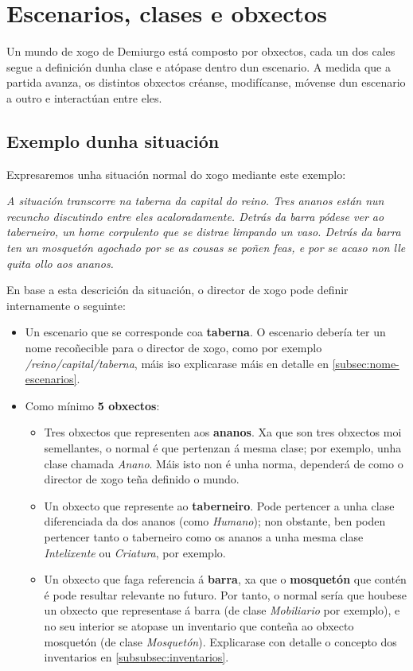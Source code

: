 \chapter{Escenarios, clases e obxectos}
Un mundo de xogo de Demiurgo está composto por obxectos, cada un dos cales
segue a definición dunha clase e atópase dentro dun escenario. A medida que
a partida avanza, os distintos obxectos créanse, modifícanse, móvense dun
escenario a outro e interactúan entre eles.
\section{Exemplo dunha situación}
Expresaremos unha situación normal do xogo mediante este exemplo:
\par
{\it A situación transcorre na taberna da capital do reino. Tres ananos están
nun recuncho discutindo entre eles acaloradamente. Detrás da barra pódese ver ao
taberneiro, un home corpulento que se distrae limpando un vaso. Detrás da barra
ten un mosquetón agochado por se as cousas se poñen feas, e por se acaso non
lle quita ollo aos ananos.}
\par
En base a esta descrición da situación, o director de xogo pode definir
internamente o seguinte:
\begin{itemize}
  \item Un escenario que se corresponde coa {\bf taberna}. O escenario debería
  ter un nome recoñecible para o director de xogo, como por exemplo {\it
  /reino/capital/taberna}, máis iso explicarase máis en detalle
  en \ref{subsec:nome-escenarios}.
  \item Como mínimo {\bf 5 obxectos}: \begin{itemize}
    \item Tres obxectos que representen aos {\bf ananos}. Xa que son tres
    obxectos moi semellantes, o normal é que pertenzan á mesma clase; por
    exemplo, unha clase chamada {\it Anano}. Máis isto non é unha norma,
    dependerá de como o director de xogo teña definido o mundo.
    \item Un obxecto que represente ao {\bf taberneiro}. Pode pertencer a unha
    clase diferenciada da dos ananos (como {\it Humano}); non obstante, ben poden
    pertencer tanto o taberneiro como os ananos a unha mesma clase {\it
    Intelixente} ou {\it Criatura}, por exemplo.
    \item Un obxecto que faga referencia á {\bf barra}, xa que o {\bf mosquetón}
    que contén é pode resultar relevante no futuro. Por tanto, o normal sería  que
    houbese un obxecto que representase á barra (de clase {\it Mobiliario} por
    exemplo), e no seu interior se atopase un inventario que conteña ao obxecto
    mosquetón (de clase {\it Mosquetón}). Explicarase con detalle o concepto dos
    inventarios en \ref{subsubsec:inventarios}.
  \end{itemize}
\end{itemize}
